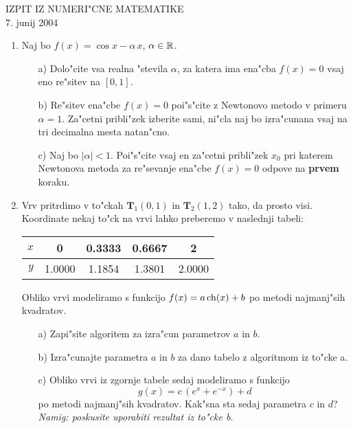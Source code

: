 

\begin{center}
  IZPIT IZ NUMERI"CNE MATEMATIKE\\
  7. junij 2004
\end{center}
\vspace{1cm}

\begin{enumerate}
  \item Naj bo $f(x)=\cos{x}-\alpha\,x$, $\alpha\in\mathbb{R}$.
  \begin{itemize}
    \item[a)] Dolo"cite vsa realna "stevila $\alpha$, za katera
      ima ena"cba $f(x)=0$ vsaj eno re"sitev na $[0,1]$.
    \item[b)] Re"sitev ena"cbe $f(x)=0$ poi"s"cite z Newtonovo metodo
      v primeru $\alpha=1$.
      Za"cetni pribli"zek izberite sami, ni"cla naj bo izra"cunana
      vsaj na tri decimalna mesta natan"cno.
    \item[c)] Naj bo $|\alpha|<1$. Poi"s"cite vsaj en za"cetni pribli"zek
      $x_0$ pri katerem Newtonova metoda za re"sevanje ena"cbe
      $f(x)=0$ odpove na {\bf prvem} koraku.  
  \end{itemize}
  \item Vrv pritrdimo v to"ckah $\mathbf{T}_1(0,1)$ in $\mathbf{T}_2(1,2)$ tako,
    da prosto visi. Koordinate nekaj to"ck na vrvi lahko 
    preberemo v naslednji tabeli:
    \begin{center}
    \begin{tabular}{r|cccc}
        $x$ & 0 & 0.3333 & 0.6667 & 2\\ \hline
        $y$ & 1.0000 & 1.1854 & 1.3801 & 2.0000
      \end{tabular}
    \end{center}
    
    Obliko vrvi modeliramo s funkcijo $f(x)=a\,{\rm ch}(x)+b$ po metodi
    najmanj"sih kvadratov.
    \begin{itemize}
     \item[a)] Zapi"site algoritem za izra"cun parametrov $a$ in $b$.
     \item[b)] Izra"cunajte parametra $a$ in $b$ za dano tabelo z 
       algoritmom iz to"cke a.
     \item[c)] Obliko vrvi iz zgornje tabele sedaj modeliramo s funkcijo 
       $$g(x)=c\,(e^{x}+e^{-x})+d$$ 
       po metodi najmanj"sih kvadratov.
       Kak"sna sta sedaj parametra $c$ in $d$?\\
       {\sl Namig: poskusite uporabiti rezultat iz to"cke b.}
    \end{itemize}
\end{enumerate}



